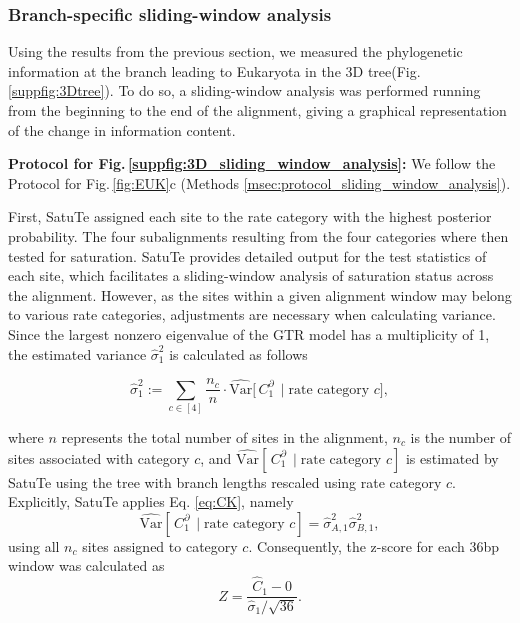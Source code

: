 \begin{appendices}
\medskip





\subsubsection{Branch-specific sliding-window analysis}\label{suppsec:3DT_sliding_window_analysis}

Using the results from the previous section, we measured the phylogenetic information at the branch leading to Eukaryota in the 3D tree(Fig.\,\ref{suppfig:3Dtree}). To do so, a sliding-window analysis was performed running from the beginning to the end of the alignment, giving a graphical representation of the change in information content.

\medskip

\noindent \textbf{Protocol for Fig.\,\ref{suppfig:3D_sliding_window_analysis}:} We follow the Protocol for Fig.\,\ref{fig:EUK}c (Methods  \ref{msec:protocol_sliding_window_analysis}).

\medskip
First, SatuTe assigned each site to the rate category with the highest posterior probability. The four subalignments resulting from the four categories where then tested for saturation.  SatuTe provides detailed output for the test statistics of each site, which facilitates a sliding-window analysis of saturation status across the alignment. However, as the sites within a given alignment window may belong to
various rate categories, adjustments are necessary when calculating variance.
Since the largest nonzero eigenvalue of the GTR model has a multiplicity of 1, the estimated variance $\hat\sigma_1^2$ is calculated as follows

\begin{equation}
\hat\sigma_1^2 := \sum_{c\in[4]} \frac{n_c}{n}\cdot\mathrm{\widehat{Var}}\Big[\, C^\partial_1 \,\mid \text{rate category $c$}\Big],
\end{equation}

where $n$ represents the total number of sites in the alignment, $n_c$ is the number of sites associated with category $c$, and $\mathrm{\widehat{Var}}[\, C^\partial_1 \,\mid \text{rate category $c$}]$ is estimated by SatuTe using the tree with branch lengths rescaled using rate category $c$. Explicitly, SatuTe applies Eq. \ref{eq:CK}, namely
  \begin{equation}
 \mathrm{\widehat{Var}}[\, C^\partial_1 \,\mid \text{rate category $c$}] = \hat{\sigma}^2_{A,1} \hat{\sigma}^2_{B,1},
  \end{equation}
using all $n_c$ sites assigned to category $c$. Consequently, the z-score for each $36$bp window was calculated as
\begin{equation}
Z = \frac{\hat{C}_1-0}
{
\hat\sigma_1/\sqrt{36}
}.
\end{equation}


\end{appendices}
